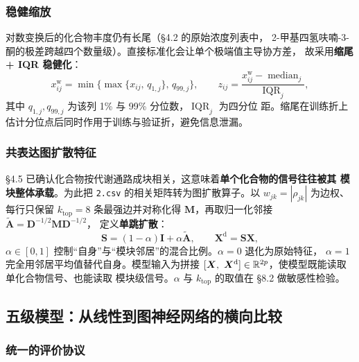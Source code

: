 \subsubsection{稳健缩放}

对数变换后的化合物丰度仍有长尾（\S4.2 的原始浓度列表中，
2-甲基四氢呋喃-3-酮的极差跨越四个数量级）。直接标准化会让单个极端值主导协方差，
故采用\textbf{缩尾 + IQR 稳健化}：
\begin{equation}
x^{\mathrm{w}}_{ij}=\min\{\max\{x_{ij},\,q_{1,j}\},\,q_{99,j}\},\qquad
z_{ij}=\frac{x^{\mathrm{w}}_{ij}-\operatorname{median}_{j}}
{\operatorname{IQR}_{j}},
\label{eq:robust}
\end{equation}
其中 $q_{1,j},q_{99,j}$ 为该列 1\% 与 99\% 分位数，$\operatorname{IQR}_j$ 为四分位
距。缩尾在训练折上估计分位点后同时作用于训练与验证折，避免信息泄漏。

\subsubsection{共表达图扩散特征}

\S4.5 已确认化合物按代谢通路成块相关，这意味着\textbf{单个化合物的信号往往被其
模块整体承载}。为此把 \texttt{2.csv} 的相关矩阵转为图扩散算子。以 $w_{jk}=
|\rho_{jk}|$ 为边权、每行只保留 $k_{\mathrm{top}}=8$ 条最强边并对称化得
$\bm{M}$，再取归一化邻接 $\tilde{\bm{A}}=\bm{D}^{-1/2}\bm{M}\bm{D}^{-1/2}$，
定义\textbf{单跳扩散}：
\begin{equation}
\bm{S}=(1-\alpha)\bm{I}+\alpha\tilde{\bm{A}},\qquad
\bm{X}^{\mathrm{d}}=\bm{S}\bm{X},
\label{eq:diffuse}
\end{equation}
$\alpha\in[0,1]$ 控制“自身”与“模块邻居”的混合比例。$\alpha=0$ 退化为原始特征，
$\alpha=1$ 完全用邻居平均值替代自身。模型输入为拼接
$[\bm{X},\ \bm{X}^{\mathrm{d}}]\in\R^{2p}$，使模型既能读取单化合物信号、也能读取
模块级信号。$\alpha$ 与 $k_{\mathrm{top}}$ 的取值在 \S8.2 做敏感性检验。

\subsection{五级模型：从线性到图神经网络的横向比较}

\subsubsection{统一的评价协议}


